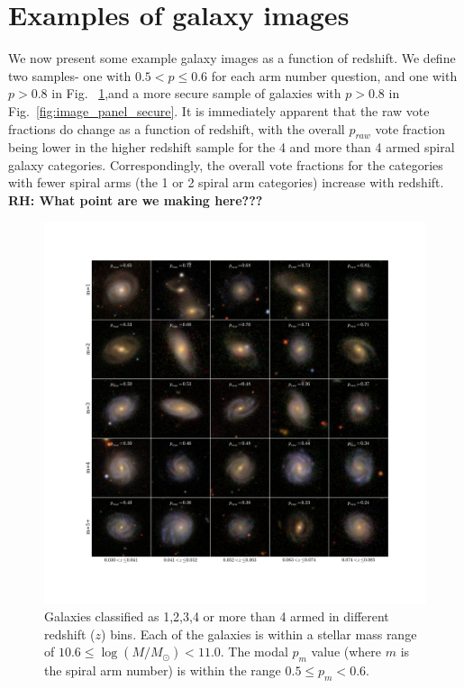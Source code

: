 \documentclass[useAMS,usenatbib]{mn2e}
\newcommand{\rh}[1]{{\bf \textcolor{RoyalPurple}{RH: #1}}}
\begin{document}
\appendix
\section{Examples of galaxy images}

We now present some example galaxy images as a function of redshift. We define two samples- one with $0.5< p \leq 0.6$ for each arm number question, and one with $p > 0.8$ in Fig. ~\ref{fig:image_panel},and a more secure sample of galaxies with $p > 0.8$ in Fig.~\ref{fig:image_panel_secure}. It is immediately apparent that the raw vote fractions do change as a function of redshift, with the overall $p_{raw}$ vote fraction being lower in the higher redshift sample for the 4 and more than 4 armed spiral galaxy categories. Correspondingly, the overall vote fractions for the categories with fewer spiral arms (the 1 or 2 spiral arm categories) increase with redshift. \rh{What point are we making here???}

\begin{figure}
		\centering

        \includegraphics[width=1\textwidth]{Images/Results/image_page_p0506_m106110.pdf}

        \caption{Galaxies classified as 1,2,3,4 or more than 4 armed in different redshift ($z$) bins. Each of the galaxies is within a stellar mass range of $10.6 \leq \log(M/M_{\odot}) < 11.0$. The modal $p_m$ value (where $m$ is the spiral arm number) is within the range $0.5 \leq p_m < 0.6$.}

        \label{fig:image_panel}

\end{figure}
\end{document}
